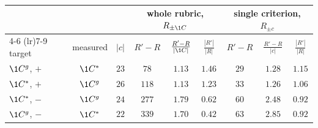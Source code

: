 \begin{table}[h]
\centering
\small
\begin{tabular}{lcccccccc}
\toprule
 & \multicolumn{2}{c}{} & \multicolumn{3}{c}{whole rubric, $R_{\pm\1C}$} & \multicolumn{3}{c}{single criterion, $R_{\pm c}$} \\
\cmidrule(lr){4-6} \cmidrule(lr){7-9}
target & measured & $|c|$ & $R' - R$ & $\frac{R' - R}{|\1C|}$ & $\frac{|R'|}{|R|}$ & $R' - R$ & $\frac{R' - R}{|c|}$ & $\frac{|R'|}{|R|}$ \\
\midrule
$\1C^g$, $+$ & $\1C^*$ & $23$ & $78$ & $1.13$ & $1.46$ & $29$ & $1.28$ & $1.15$ \\
$\1C^*$, $+$ & $\1C^g$ & $26$ & $118$ & $1.13$ & $1.23$ & $33$ & $1.26$ & $1.06$ \\
$\1C^*$, $-$ & $\1C^g$ & $24$ & $277$ & $1.79$ & $0.62$ & $60$ & $2.48$ & $0.92$ \\
$\1C^g$, $-$ & $\1C^*$ & $22$ & $339$ & $1.70$ & $0.42$ & $63$ & $2.85$ & $0.92$ \\
\bottomrule
\end{tabular}
\caption{}
\label{tab:perturbation_text_stats}
\end{table}
